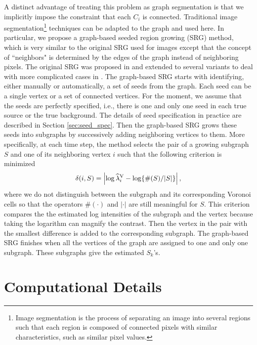 \documentclass{aastex61}
\begin{document}
A distinct advantage of treating this problem as graph segmentation is that we implicitly impose the constraint that each $C_i$ is connected. Traditional image segmentation\footnote{Image segmentation is the process of separating an image into several regions such that each region is composed of connected pixels with similar characteristics, such as similar pixel values.} 
techniques can be adapted to the graph and used here. In particular, we propose a graph-based seeded region growing (SRG) method, which is very similar to the original SRG used for images except that the concept of ``neighbors" is determined by the edges of the graph instead of neighboring pixels. The original SRG was proposed in \citet{Adams-94} and extended to several variants to deal with more complicated cases in \citet{Fan-14}. The graph-based SRG starts with identifying, either manually or automatically, a set of seeds from the graph. Each seed can be a single vertex or a set of connected vertices. For the moment, we assume that the seeds are perfectly specified, i.e., there is one and only one seed in each true source or the true background. The details of seed specification in practice are described in Section \ref{sec:seed_spec}. Then the graph-based SRG grows these seeds into subgraphs by successively adding neighboring vertices to them. More specifically, at each time step, the method selects the pair of a growing subgraph $S$ and one of its neighboring vertex $i$ such that the following criterion is minimized
\begin{equation}\label{eqn: min_criterion}
\delta(i, S)=\left \lvert \log \widehat{\lambda}_i^{\rm V} - \log\{\#(S)/|S|\} \right \rvert,
\end{equation}
where we do not distinguish between the subgraph and its corresponding Voronoi cells so that the operators $\#(\cdot)$ and $|\cdot|$ are still meaningful for $S$. This criterion compares the  
the estimated log intensities of the subgraph and the vertex because taking the logarithm can magnify the contrast. Then the vertex in the pair with the smallest difference is added to the corresponding subgraph.
The graph-based SRG finishes when all the vertices of the graph are assigned to one and only one subgraph. These subgraphs give the estimated $S_k$'s.

\section{Computational Details}
\end{document}

